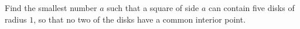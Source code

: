 Find the smallest number $a$ such that a square of side $a$ can contain five disks of radius $1$,  so that no two of the disks have a common interior point.